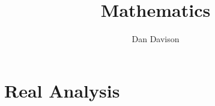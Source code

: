 \documentclass{book}
\title{Mathematics}
\author{Dan Davison}
\begin{document}
\frontmatter
\maketitle
\tableofcontents
\mainmatter


% 

% 

% 

% 
% 

\chapter{Real Analysis}


% 
% 

% 

% 

% 

% 
% 
\end{document}

